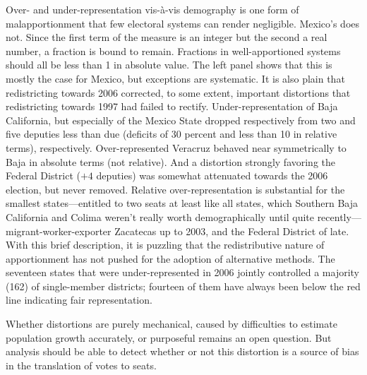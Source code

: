 \documentclass[letter,12pt]{article}
\begin{document}
Over- and under-representation vis-\`a-vis demography is one form of malapportionment that few electoral systems can render negligible. Mexico's does not. Since the first term of the measure is an integer but the second a real number, a fraction is bound to remain. Fractions in well-apportioned systems should all be less than 1 in absolute value. The left panel shows that this is mostly the case for Mexico, but exceptions are systematic. It is also plain that redistricting towards 2006 corrected, to some extent, important distortions that redistricting towards 1997 had failed to rectify. Under-representation of Baja California, but especially of the Mexico State dropped respectively from two and five deputies less than due (deficits of 30 percent and less than 10 in relative terms), respectively. Over-represented Veracruz behaved near symmetrically to Baja in absolute terms (not relative). And a distortion strongly favoring the Federal District ($+4$ deputies) was somewhat attenuated towards the 2006 election, but never removed. Relative over-representation is substantial for the smallest states---entitled to two seats at least like all states, which Southern Baja California and Colima weren't really worth demographically until quite recently---migrant-worker-exporter Zacatecas up to 2003, and the Federal District of late. With this brief description, it is puzzling that the redistributive nature of apportionment has not pushed for the adoption of alternative methods. The seventeen states that were under-represented in 2006 jointly controlled a majority (162) of single-member districts; fourteen of them have always been below the red line indicating fair representation. 

Whether distortions are purely mechanical, caused by difficulties to estimate population growth accurately, or purposeful remains an open question. But analysis should be able to detect whether or not this distortion is a source of bias in the translation of votes to seats. 


\end{document}
